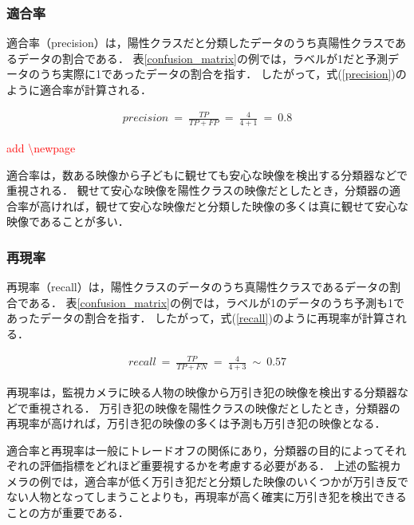 \documentclass[12pt,a4j]{jreport}
\begin{document}


\subsubsection{適合率}
\label{subsubsection_precision}
適合率（precision）は，陽性クラスだと分類したデータのうち真陽性クラスであるデータの割合である\cite{aurellen20}．
表\ref{confusion_matrix}の例では，ラベルが1だと予測データのうち実際に1であったデータの割合を指す．
したがって，式(\ref{precision})のように適合率が計算される．

\begin{align}
  precision ~=~ \frac{TP}{TP+FP} ~=~ \frac{4}{4+1} ~=~ 0.8
  \label{precision}
\end{align}

\textcolor{red}{add \textbackslash newpage}
\newpage

適合率は，数ある映像から子どもに観せても安心な映像を検出する分類器などで重視される．
観せて安心な映像を陽性クラスの映像だとしたとき，分類器の適合率が高ければ，観せて安心な映像だと分類した映像の多くは真に観せて安心な映像であることが多い．


\subsubsection{再現率}
\label{subsubsection_recall}
再現率（recall）は，陽性クラスのデータのうち真陽性クラスであるデータの割合である\cite{aurellen20}．
表\ref{confusion_matrix}の例では，ラベルが1のデータのうち予測も1であったデータの割合を指す．
したがって，式(\ref{recall})のように再現率が計算される．

\begin{align}
  recall ~=~ \frac{TP}{TP+FN} ~=~ \frac{4}{4+3} ~\sim~ 0.57
  \label{recall}
\end{align}

再現率は，監視カメラに映る人物の映像から万引き犯の映像を検出する分類器などで重視される．
万引き犯の映像を陽性クラスの映像だとしたとき，分類器の再現率が高ければ，万引き犯の映像の多くは予測も万引き犯の映像となる．

適合率と再現率は一般にトレードオフの関係にあり，分類器の目的によってそれぞれの評価指標をどれほど重要視するかを考慮する必要がある．
上述の監視カメラの例では，適合率が低く万引き犯だと分類した映像のいくつかが万引き反でない人物となってしまうことよりも，再現率が高く確実に万引き犯を検出できることの方が重要である．
\end{document}
